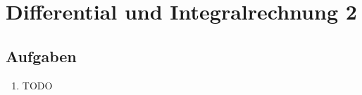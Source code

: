 \chapter{Differential und Integralrechnung 2}

\section{Aufgaben}
\begin{enumerate}
\item TODO
\end{enumerate}
